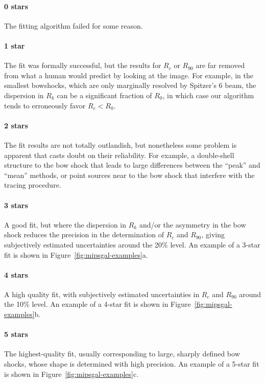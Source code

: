 \documentclass[useAMS, usenatbib, a4paper]{mnras}
\begin{document}
\paragraph*{0 stars} The fitting algorithm failed for some reason. 

\paragraph*{1 star} The fit was formally successful, but the results
for \(R_c\) or \(R_{90}\) are far removed from what a human would
predict by looking at the image.  For example, in the smallest
bowshocks, which are only marginally resolved by Spitzer's 6\arcsec{}
beam, the dispersion in \(R_k\) can be a significant fraction of
\(R_0\), in which case our algorithm tends to erroneously favor
\(R_c < R_0\).

\paragraph*{2 stars} The fit results are not totally outlandish, but
nonetheless some problem is apparent that casts doubt on their
reliability.  For example, a double-shell structure to the bow shock
that leads to large differences between the ``peak'' and ``mean''
methods, or point sources near to the bow shock that interfere with
the tracing procedure.
  
\paragraph*{3 stars} A good fit, but where the dispersion in \(R_k\)
and/or the asymmetry in the bow shock reduces the precision in the
determination of \(R_c\) and \(R_{90}\), giving subjectively estimated
uncertainties around the 20\% level.  An example of a 3-star fit is
shown in Figure~\ref{fig:mipsgal-examples}a.

\paragraph*{4 stars} A high quality fit, with subjectively estimated
uncertainties in \(R_c\) and \(R_{90}\) around the 10\% level. An
example of a 4-star fit is shown in
Figure~\ref{fig:mipsgal-examples}b.

\paragraph*{5 stars} The highest-quality fit, usually corresponding to
large, sharply defined bow shocks, whose shape is determined with high
precision. An example of a 5-star fit is shown in
Figure~\ref{fig:mipsgal-examples}c.
\bigskip
\end{document}
